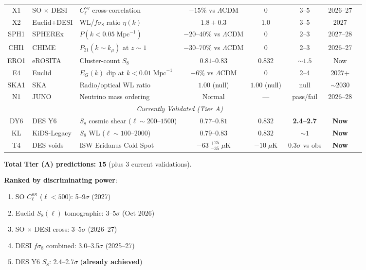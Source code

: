 \documentclass[11pt,a4paper]{article}
\newcommand{\LCDM}{$\Lambda$CDM}
\newcommand{\kmu}{k_\mu}
\begin{document}
\begin{granitebox}
\begin{longtable}{@{}clp{3.8cm}ccccc@{}}
X1 & SO $\times$ DESI &
$C_\ell^{\kappa g}$ cross-correlation
& $-15\%$ vs \LCDM & 0 & 3--5 & 2026--27 \\[3pt]

X2 & Euclid+DESI &
WL/$f\sigma_8$ ratio $\eta(k)$
& $1.8 \pm 0.3$ & $1.0$ & 3--5 & 2027 \\[3pt]

SPH1 & SPHEREx &
$P(k < 0.05\;\text{Mpc}^{-1})$
& $-20$--$40\%$ vs \LCDM & 0 & 2--3 & 2027--28 \\[3pt]

CHI1 & CHIME &
$P_{21}(k \sim \kmu)$ at $z \sim 1$
& $-30$--$70\%$ vs \LCDM & 0 & 2--3 & 2026--27 \\[3pt]

ERO1 & eROSITA &
Cluster-count $S_8$
& $0.81$--$0.83$ & $0.832$ & $\sim 1.5$ & Now \\[3pt]

E4 & Euclid &
$E_G(k)$ dip at $k < 0.01\;\text{Mpc}^{-1}$
& $-6\%$ vs \LCDM & 0 & 2--4 & 2027+ \\[3pt]

SKA1 & SKA &
Radio/optical WL ratio
& $1.00$ (null) & $1.00$ (null) & null & $\sim$2030 \\[3pt]

N1 & JUNO &
Neutrino mass ordering
& Normal & --- & pass/fail & 2026--28 \\

\midrule
\multicolumn{7}{c}{\textit{Currently Validated (Tier A)}} \\
\midrule

DY6 & DES Y6 &
$S_8$ cosmic shear ($\ell \sim 200$--$1500$)
& $0.77$--$0.81$ & $0.832$ & \textbf{2.4--2.7} & \textbf{Now} \\[3pt]

KL & KiDS-Legacy &
$S_8$ WL ($\ell \sim 100$--$2000$)
& $0.79$--$0.83$ & $0.832$ & $\sim 1$ & \textbf{Now} \\[3pt]

T4 & DES voids &
ISW Eridanus Cold Spot
& $-63\;{}^{+25}_{-35}\;\mu$K & $-10\;\mu$K & $0.3\sigma$ vs obs
& \textbf{Now} \\

\bottomrule

\end{longtable}

\normalsize
\textbf{Total Tier (A) predictions: 15} (plus 3 current validations).

\textbf{Ranked by discriminating power}:
\begin{enumerate}[nosep]
\item SO $C_\ell^{\kappa\kappa}$ ($\ell < 500$): 5--9$\sigma$ (2027)
\item Euclid $S_8(\ell)$ tomographic: 3--5$\sigma$ (Oct 2026)
\item SO $\times$ DESI cross: 3--5$\sigma$ (2026--27)
\item DESI $f\sigma_8$ combined: 3.0--3.5$\sigma$ (2025--27)
\item DES Y6 $S_8$: 2.4--2.7$\sigma$ (\textbf{already achieved})
\end{enumerate}


\end{granitebox}
\end{document}
